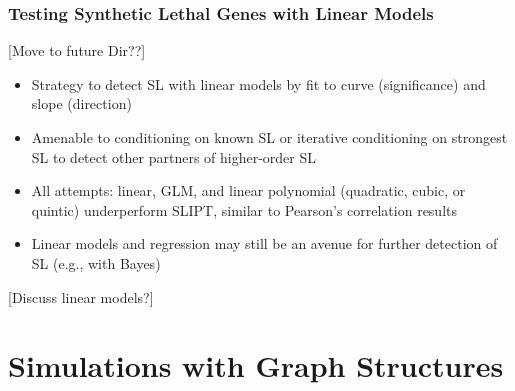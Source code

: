 \subsubsection{Testing Synthetic Lethal Genes with Linear Models}
\label{chapt5:compare_linear_model}
[Move to future Dir??]

\begin{itemize}
 \item Strategy to detect SL with linear models by fit to curve (significance) and slope (direction)
 \item Amenable to conditioning on known SL or iterative conditioning on strongest SL to detect other partners of higher-order SL
 \item All attempts: linear, GLM, and linear polynomial (quadratic, cubic, or quintic) underperform \gls{SLIPT}, similar to Pearson's correlation results
 \item Linear models and regression may still be an avenue for further detection of SL (e.g., with Bayes)
\end{itemize}
\fi

[Discuss linear models?]


\iffalse
\section{Developing a linear model predictor of synthetic lethality}
\subsection{Linear models}
\subsection{Polynomial models}
\subsection{Conditioning}
\subsection{SLIPTv2}
\fi

\section{Simulations with Graph Structures}
\label{chapt5:graphsim}

